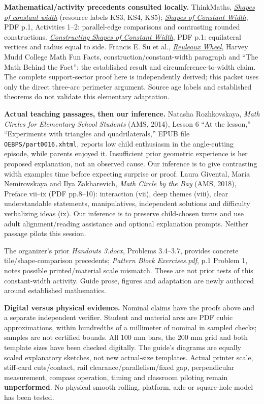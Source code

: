 \documentclass[11pt,letterpaper]{article}
\newcommand{\heading}[1]{\par\vspace{2pt}{\large\bfseries #1}\par}
\newcommand{\lead}[1]{\textbf{#1}}
\begin{document}
\heading{Sources, adaptation and evidence limits}
\small
\lead{Mathematical/activity precedents consulted locally.} ThinkMaths, \href{https://think-maths.co.uk/resources/shapes-constant-width/}{\emph{Shapes of constant width}} (resource labels KS3, KS4, KS5); \href{https://think-maths.co.uk/wp-content/uploads/2023/03/Shapes-of-Constant-Width_0.pdf}{\emph{Shapes of Constant Width}}, PDF p.1, Activities 1--2: parallel-edge comparisons and contrasting rounded constructions. \href{https://think-maths.co.uk/wp-content/uploads/2023/03/Constructing-Shapes-of-Constant-Width.pdf}{\emph{Constructing Shapes of Constant Width}}, PDF p.1: equilateral vertices and radius equal to side. Francis E. Su et al., \href{https://math.hmc.edu/funfacts/reuleaux-wheel/}{\emph{Reuleaux Wheel}}, Harvey Mudd College Math Fun Facts, construction/constant-width paragraph and ``The Math Behind the Fact'': the established result and circumference-to-width claim. The complete support-sector proof here is independently derived; this packet uses only the direct three-arc perimeter argument. Source age labels and established theorems do not validate this elementary adaptation.

\lead{Actual teaching passages, then our inference.} Natasha Rozhkovskaya, \emph{Math Circles for Elementary School Students} (AMS, 2014), Lesson 6 ``At the lesson,'' ``Experiments with triangles and quadrilaterals,'' EPUB file \texttt{OEBPS/}\allowbreak\texttt{part0016.xhtml}, reports low child enthusiasm in the angle-cutting episode, while parents enjoyed it. Insufficient prior geometric experience is her proposed explanation, not an observed cause. Our inference is to give contrasting width examples time before expecting surprise or proof. Laura Givental, Maria Nemirovskaya and Ilya Zakharevich, \emph{Math Circle by the Bay} (AMS, 2018), Preface vii--ix (PDF pp.8--10): interaction (vii), deep themes (viii), clear understandable statements, manipulatives, independent solutions and difficulty verbalizing ideas (ix). Our inference is to preserve child-chosen turns and use adult alignment/reading assistance and optional explanation prompts. Neither passage pilots this session.

The organizer's prior \emph{Handouts 3.docx}, Problems 3.4--3.7, provides concrete tile/shape-comparison precedents; \emph{Pattern Block Exercises.pdf}, p.1 Problem 1, notes possible printed/material scale mismatch. These are not prior tests of this constant-width activity. Guide prose, figures and adaptation are newly authored around established mathematics.

\lead{Digital versus physical evidence.} Nominal claims have the proofs above and a separate independent verifier. Student and material arcs are PDF cubic approximations, within hundredths of a millimeter of nominal in sampled checks; samples are not certified bounds. All 100 mm bars, the 200 mm grid and both template sizes have been checked digitally. The guide's diagrams are equally scaled explanatory sketches, not new actual-size templates. Actual printer scale, stiff-card cuts/contact, rail clearance/parallelism/fixed gap, perpendicular measurement, compass operation, timing and classroom piloting remain \textbf{unperformed}. No physical smooth rolling, platform, axle or square-hole model has been tested.
\end{document}
